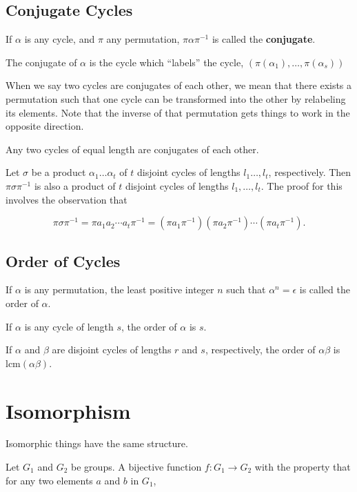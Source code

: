 \documentclass[11pt]{article}
\begin{document}
\subsection{Conjugate Cycles}\label{conjugate-cycles}

If \(\alpha\) is any cycle, and \(\pi\) any permutation,
\(\pi\alpha\pi^{-1}\) is called the \textbf{conjugate}.

The conjugate of \(\alpha\) is the cycle which ``labels'' the cycle,
\((\pi(\alpha_1),\ldots,\pi(\alpha_s))\)

When we say two cycles are conjugates of each other, we mean that there
exists a permutation such that one cycle can be transformed into the
other by relabeling its elements. Note that the inverse of that
permutation gets things to work in the opposite direction.

Any two cycles of equal length are conjugates of each other.

Let \(\sigma\) be a product \(\alpha_1 \ldots \alpha_t\) of \(t\)
disjoint cycles of lengths \(l_1 \ldots, l_t\), respectively. Then
\(\pi \sigma \pi^{-1}\) is also a product of \(t\) disjoint cycles of
lengths \(l_1, \ldots, l_t\). The proof for this involves the
observation that

\[
\pi \sigma \pi^{-1}=\pi a_1 a_2 \cdots a_t \pi^{-1}=\left(\pi a_1 \pi^{-1}\right)\left(\pi a_2 \pi^{-1}\right) \cdots\left(\pi a_t \pi^{-1}\right) .
\]

\subsection{Order of Cycles}\label{order-of-cycles}

If \(\alpha\) is any permutation, the least positive integer \(n\) such
that \(\alpha^n = \epsilon\) is called the order of \(\alpha\).

If \(\alpha\) is any cycle of length \(s\), the order of \(\alpha\) is
\(s\).

If \(\alpha\) and \(\beta\) are disjoint cycles of lengths \(r\) and
\(s\), respectively, the order of \(\alpha\beta\) is
\(\text{lcm}({\alpha\beta})\).

    \section{Isomorphism}\label{isomorphism}

Isomorphic things have the same structure.

Let \(G_1\) and \(G_2\) be groups. A bijective function
\(f: G_1 \rightarrow G_2\) with the property that for any two elements
\(a\) and \(b\) in \(G_1\),
\end{document}
